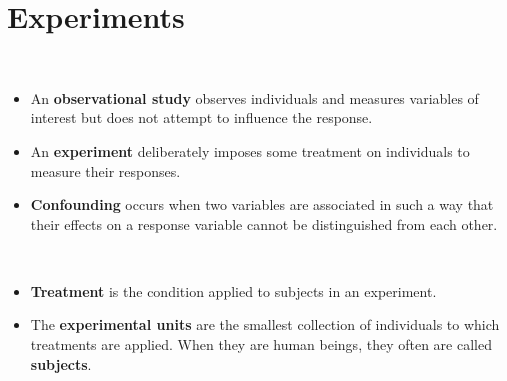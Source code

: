 \documentclass[Main.tex]{subfiles}
\begin{document}
	\section{Experiments}
	
	\begin{exercise} \hfill \\
		\begin{itemize}	
			\item An \textbf{observational study} observes individuals and measures variables of interest but does not attempt to influence the response.\\
			\item An \textbf{experiment} deliberately imposes some treatment on individuals to measure their responses.\\
			\item \textbf{Confounding} occurs when two variables are associated in such a way that their effects on a response variable cannot be distinguished from each other.
		\end{itemize}
	\end{exercise}
	
	\begin{exercise} \hfill \\
		\begin{itemize}	
			\item \textbf{Treatment} is the condition applied to subjects in an experiment.\\
			\item The \textbf{experimental units} are the smallest collection of individuals to which treatments are applied. When they are human beings, they often are called \textbf{subjects}.
		\end{itemize}
	\end{exercise} \newpage
	
\end{document}

